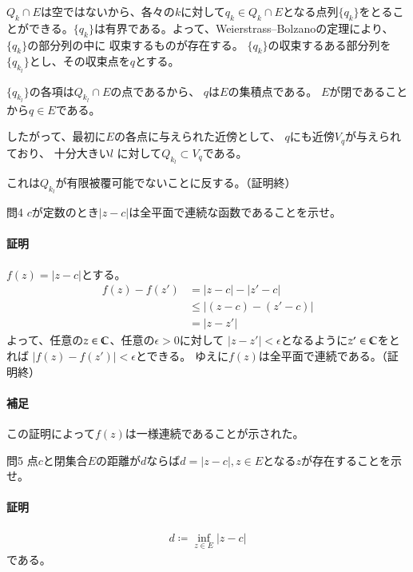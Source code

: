 $Q_k\cap E$は空ではないから、各々の$k$に対して$q_k\in Q_k\cap E$となる点列$\{q_k\}$をとることができる。$\{q_k\}$は有界である。よって、Weierstrass--Bolzanoの定理により、$\{q_k\}$の部分列の中に
収束するものが存在する。
$\{q_k\}$の収束するある部分列を$\{q_{k_l}\}$とし、その収束点を$q$とする。

$\{q_{k_l}\}$の各項は$Q_{k_l}\cap E$の点であるから、
$q$は$E$の集積点である。
$E$が閉であることから$q\in E$である。

したがって、最初に$E$の各点に与えられた近傍として、
$q$にも近傍$V_q$が与えられており、
十分大きい$l$ に対して$Q_{k_l}\subset V_q$である。

これは$Q_{k_l}$が有限被覆可能でないことに反する。（証明終）

\begin{mysimplebox}{問4}
    $c$が定数のとき$|z-c|$は全平面で連続な函数であることを示せ。
\end{mysimplebox}
\paragraph{証明}
$f(z)=|z-c|$とする。
\begin{align*}
    f(z)-f(z')&=|z-c|-|z'-c|\\
    &\le |(z-c)-(z'-c)|\\
    &=|z-z'|
\end{align*}
よって、任意の$z\in\mathbb{C}$、任意の$\epsilon>0$に対して
$|z-z'|<\epsilon$となるように$z'\in\mathbb{C}$をとれば
$|f(z)-f(z')|<\epsilon$とできる。
ゆえに$f(z)$は全平面で連続である。（証明終）

\paragraph{補足}
この証明によって$f(z)$は一様連続であることが示された。

\begin{mysimplebox}{問5}
    点$c$と閉集合$E$の距離が$d$ならば$d=|z-c|, z\in E$となる$z$が存在することを示せ。
\end{mysimplebox}
\paragraph{証明}
\begin{align*}
    d\coloneqq \inf_{z\in E}|z-c|
\end{align*}
である。

